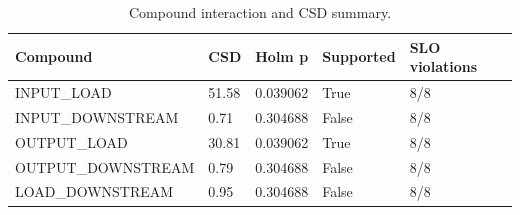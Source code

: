\begin{table}[t]
\centering
\small
\caption{Compound interaction and CSD summary.}
\begin{tabular}{lllll}
\hline
Compound & CSD & Holm p & Supported & SLO violations \\
\hline
INPUT\_LOAD & 51.58 & 0.039062 & True & 8/8 \\
INPUT\_DOWNSTREAM & 0.71 & 0.304688 & False & 8/8 \\
OUTPUT\_LOAD & 30.81 & 0.039062 & True & 8/8 \\
OUTPUT\_DOWNSTREAM & 0.79 & 0.304688 & False & 8/8 \\
LOAD\_DOWNSTREAM & 0.95 & 0.304688 & False & 8/8 \\
\hline
\end{tabular}
\end{table}
